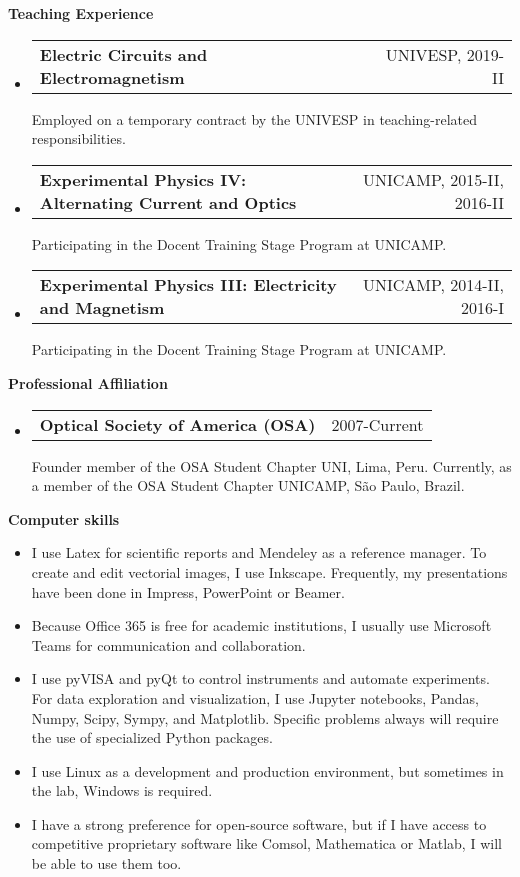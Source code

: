 \documentclass[letterpaper, 12pt]{article}[leftmargin=*]
\makeatletter
\renewcommand{\section}[2]{
  \colorbox{secondary}{\color{white}\raggedbottom\normalsize\textbf{{#1}{\hspace{7pt}#2}}}
}
\newcommand{\resumeEntryStart}{\begin{itemize}[leftmargin=2.5mm]\itemsep8pt}
\newcommand{\resumeEntryEnd}{\end{itemize}}
\newcommand{\resumeItemListStart}{\begin{itemize}[leftmargin=4.5mm]\itemsep-3pt}
\newcommand{\resumeItemListEnd}{\end{itemize}}
\newcommand{\resumeItem}[1]{
  \item\small{
    {#1}
  }
}
\newcommand{\resumeEntryTD}[2]{
  \item[]
    \begin{tabularx}{0.97\textwidth}{X@{\hspace{60pt}}r}
      \textbf{\color{primary}#1} & {\firabook\color{accent}\small#2}
    \end{tabularx}\vspace{3pt}
}
\makeatother
\begin{document}
\section{\faPencil}{Teaching Experience}
\resumeEntryStart
\resumeEntryTD
{\small Electric Circuits and Electromagnetism}{UNIVESP, 2019-II} 
\small{Employed on a temporary contract by the UNIVESP in teaching-related responsibilities.}
\resumeEntryTD
{Experimental Physics IV: Alternating Current and Optics}{UNICAMP, 2015-II, 2016-II}
\small{Participating in the Docent Training Stage Program at UNICAMP.}
\resumeEntryTD
{Experimental Physics III: Electricity and Magnetism}{UNICAMP, 2014-II, 2016-I}
\small{Participating in the Docent Training Stage Program at UNICAMP.}
\resumeEntryEnd

\section{\faGroup}{Professional Affiliation}
\resumeEntryStart
\resumeEntryTD
{\small Optical Society of America (OSA)}{2007-Current}
\small{Founder member of the OSA Student Chapter UNI, Lima, Peru. Currently, as a member of the OSA Student Chapter UNICAMP, São Paulo, Brazil.}
\resumeEntryEnd

\section{\faDesktop}{Computer skills}
\resumeItemListStart
\resumeItem{I use Latex for scientific reports and Mendeley as a reference manager. To create and edit vectorial images, I use Inkscape. Frequently, my presentations have been done in Impress, PowerPoint or Beamer.}
\resumeItem{Because Office 365 is free for academic institutions, I usually use Microsoft Teams for communication and collaboration.}
\resumeItem{I use pyVISA and pyQt to control instruments and automate experiments. For data exploration and visualization, I use Jupyter notebooks, Pandas, Numpy, Scipy, Sympy, and Matplotlib. Specific problems always will require the use of specialized Python packages.}
\resumeItem{I use Linux as a development and production environment, but sometimes in the lab, Windows is required.}
\resumeItem{I have a strong preference for open-source software, but if I have access to competitive proprietary software like Comsol, Mathematica or Matlab, I will be able to use them too.}
\resumeItemListEnd
\end{document}
